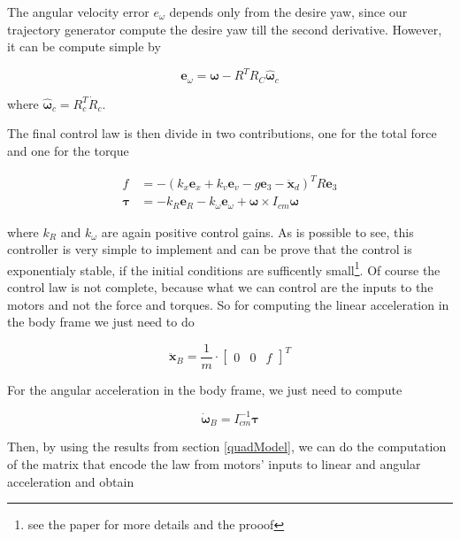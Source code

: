 \noindent The angular velocity error $e_{\omega}$ depends only from the desire yaw, since our trajectory generator compute the desire yaw till the second derivative. However, it can be compute simple by 

\begin{equation}
	\mathbf{e}_{\omega} = \boldsymbol{\omega} - R^TR_C\hat{\boldsymbol{\omega}}_c
\end{equation}

\noindent where $\hat{\boldsymbol{\omega}}_c = R_c^T\dot{R}_c$.

\noindent The final control law is then divide in two contributions, one for the total force and one for the torque

\begin{align}
	f &= -(k_x\mathbf{e}_x+k_v\mathbf{e}_v-g\mathbf{e}_3-\ddot{\mathbf{x}}_d)^TR\mathbf{e}_3 \label{eq:LeeController1} \\
	\boldsymbol{\tau} &= -k_R\mathbf{e}_R - k_{\omega}\boldsymbol{e}_{\omega} + \boldsymbol{\omega}\times I_{cm}\boldsymbol{\omega} \label{eq:LeeController2} 
\end{align}

\noindent where $k_R$ and $k_{\omega}$ are again positive control gains. As is possible to see, this controller is very simple to implement and can be prove that the control is exponentialy stable, if the initial conditions are sufficently small\footnote{see the paper \cite{LeeController} for more details and the prooof}. Of course the control law is not complete, because what we can control are the inputs to the motors and not the force and torques. So for computing the linear acceleration in the body frame we just need to do 

\begin{equation}
	\ddot{\mathbf{x}}_B = \frac{1}{m}\cdot\begin{bmatrix}0 & 0 & f\end{bmatrix}^T
\end{equation}

\noindent For the angular acceleration in the body frame, we just need to compute

\begin{equation}
	\dot{\boldsymbol{\omega}}_B = I_{cm}^{-1}\boldsymbol{\tau}
\end{equation}

\noindent Then, by using the results from section \ref{quadModel}, we can do the computation of the matrix that encode the law from motors' inputs to linear and angular acceleration and obtain

